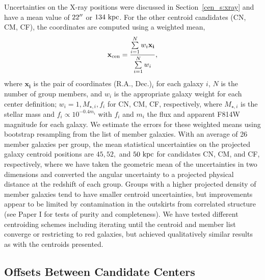 Uncertainties on the X-ray positions were discussed in Section~\ref{cen_s:xray}
and have a mean value of $22\mbox{$^{\prime\prime}$}$ or $134~\rm{kpc}$. For the other
centroid candidates (CN, CM, CF), the coordinates are computed using a
weighted mean,
\begin{equation}
\mathbf{x_{\rm cen}} = \frac{\sum\limits_{i=1}^{N} w_i \mathbf{x_i}}{\sum\limits_{i=1}^{N} w_i},
\end{equation}
where $\mathbf{x_i}$ is the pair of coordinates (R.A., Dec.)$_i$ for
each galaxy $i$, $N$ is the number of group members, and $w_i$ is the
appropriate galaxy weight for each center definition; $w_i=1,
M_{\star,i}, f_i$ for CN, CM, CF, respectively, where $M_{\star,i}$ is
the stellar mass and $f_i\propto10^{-0.4m_i}$ with $f_i$ and $m_i$ the
flux and apparent F814W magnitude for each galaxy. We estimate the
errors for these weighted means using bootstrap resampling from the
list of member galaxies.
With an average of 26 member galaxies per group, the mean statistical
uncertainties on the projected galaxy centroid positions are $45, 52,$ and
$50~\rm{kpc}$ for candidates CN, CM, and CF, respectively, where we
have taken the geometric mean of the uncertainties in two dimensions
and converted the angular uncertainty to a projected physical distance
at the redshift of each group. Groups with a higher projected density
of member galaxies tend to have smaller centroid uncertainties, but
improvements appear to be limited by contamination in the outskirts
from correlated structure (see Paper I for tests of purity and
completeness). We have tested different centroiding schemes including
iterating until the centroid and member list converge or restricting
to red galaxies, but achieved qualitatively similar results as with
the centroids presented.

\subsection{Offsets Between Candidate Centers}

